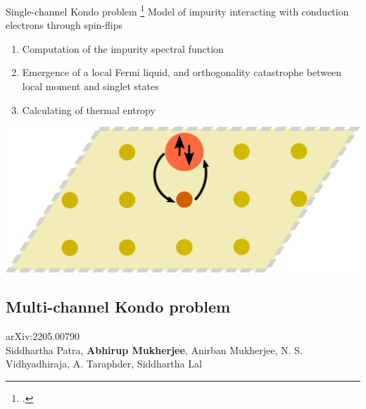 \documentclass[11pt,aspectratio=169]{beamer}
\begin{document}
\begin{frame}{Single-channel Kondo problem}
\footcite{kondo1964resistance,wilson1975,andreiKondoreview,hewson1993,nozieres1974fermi,anderson1970,tsvelickKondoreview,affleck1993exact,Goldhaber-Gordon1998,Borzenets2020,sakai_osamu_shimizu,costi_hewson_1990,nozaki2012,affleck1995conformal}
Model of impurity interacting with conduction electrons through spin-flips\\[20pt]

\begin{minipage}{0.59\textwidth}
\begin{enumerate}
\item Computation of the impurity spectral function\\[20pt]
\item Emergence of a local Fermi liquid, and orthogonality catastrophe between local moment and singlet states\\[20pt]
\item Calculating of thermal entropy\\[20pt]
\end{enumerate}
\end{minipage}
\begin{minipage}{0.4\textwidth}
	\includegraphics[width=\textwidth]{kondo-effect.pdf}
\end{minipage}

\end{frame}

\begin{frame}{}
\section{Multi-channel Kondo problem}
\small{arXiv:2205.00790\\[10pt]
Siddhartha Patra, {\bf Abhirup Mukherjee}, Anirban Mukherjee, N. S. Vidhyadhiraja, A. Taraphder, Siddhartha Lal}
\end{frame}
\end{document}
